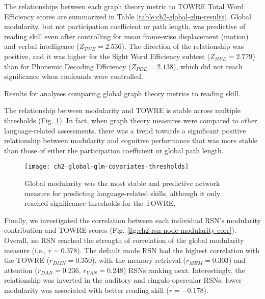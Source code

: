 The relationships between each graph theory metric to TOWRE Total Word Efficiency scores are summarized in Table \ref{table:ch2-global-glm-results}. Global modularity, but not participation coefficient or path length, was predictive of reading skill even after controlling for mean frame-wise displacement (motion) and verbal intelligence ($Z_{TWE} = 2.536$). The direction of the relationship was positive, and it was higher for the Sight Word Efficiency subtest ($Z_{SWE} = 2.779$) than for Phonemic Decoding Efficiency ($Z_{PDE} = 2.138$), which did not reach significance when confounds were controlled. 

\begin{table}[t]
    \renewcommand{\tabcolsep}{0.09cm}
    \centering
    
    \caption[Comparison of global graph theory metrics to reading skill]{Results for analyses comparing global graph theory metrics to reading skill.}
    \label{table:ch2-global-glm-results}
\end{table}

The relationship between modularity and TOWRE is stable across multiple thresholds (Fig. \ref{fig:ch2-global-glm-covariates-thresh}). In fact, when graph theory measures were compared to other language-related assessments, there was a trend towards a significant positive relationship between modularity and cognitive performance that was more stable than those of either the participation coefficient or global path length. 

\begin{figure}[t]
    \centering
    \texttt{[image: ch2-global-glm-covariates-thresholds]}
    \caption[Modularity metrics at rest are the best predictors of cognitive skills.] {Global modularity was the most stable and predictive network measure for predicting language-related skills, although it only reached significance thresholds for the TOWRE.}
    \label{fig:ch2-global-glm-covariates-thresh}
\end{figure}

Finally, we investigated the correlation between each individual RSN's modularity contribution and TOWRE scores (Fig. \ref{fig:ch2-rsn-node-modularity-corr}). Overall, no RSN reached the strength of correlation of the global modularity measure (i.e., $r = 0.378$). The default mode RSN had the highest correlation with the TOWRE ($r_{DMN} = 0.350$), with the memory retrieval ($r_{MEM} = 0.303$) and attention ($r_{DAN} = 0.236$, $r_{VAN} = 0.248$) RSNs ranking next. Interestingly, the relationship was inverted in the auditory and cingulo-opercular RSNs: lower modularity was associated with better reading skill ($r = -0.178$).

